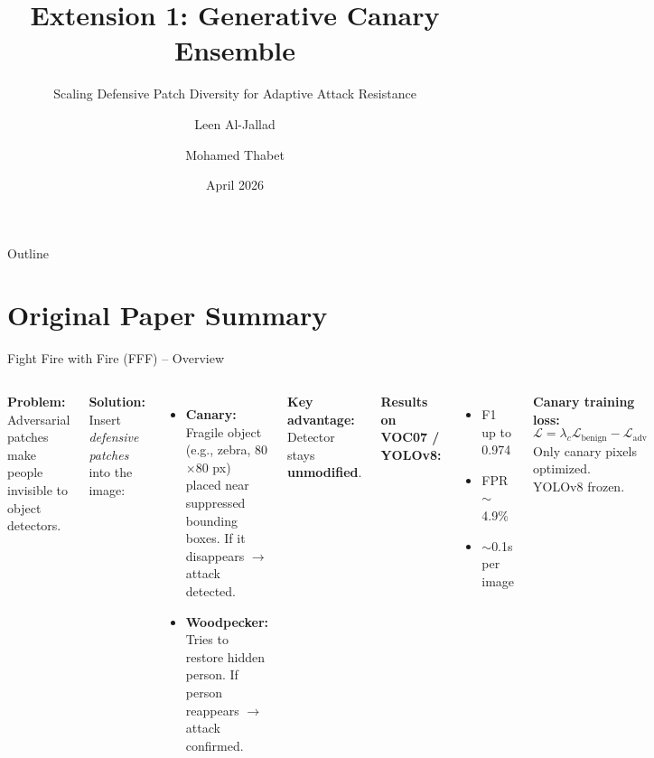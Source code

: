 \documentclass[aspectratio=169,11pt]{beamer}
\title[Extension 1: Generative Canary Ensemble]{Extension 1: Generative Canary Ensemble}
\subtitle{Scaling Defensive Patch Diversity for Adaptive Attack Resistance}
\author{Leen Al-Jallad \and Mohamed Thabet}
\institute{COSC 739 -- AI/ML Systems for Cybersecurity\\Khalifa University}
\date{April 2026}
\begin{document}
\begin{frame}
\titlepage
\end{frame}

\begin{frame}{Outline}
\tableofcontents
\end{frame}

\section{Original Paper Summary}

\begin{frame}{Fight Fire with Fire (FFF) -- Overview}
\begin{columns}
\textbf{Problem:} Adversarial patches make people invisible to object detectors.

\vspace{0.3cm}
\textbf{Solution:} Insert \textit{defensive patches} into the image:
\begin{itemize}
    \item \textbf{Canary:} Fragile object (e.g., zebra, 80$\times$80 px) placed near suppressed bounding boxes. If it disappears $\to$ attack detected.
    \item \textbf{Woodpecker:} Tries to restore hidden person. If person reappears $\to$ attack confirmed.
\end{itemize}

\vspace{0.3cm}
\textbf{Key advantage:} Detector stays \textbf{unmodified}.

\textbf{Results on VOC07 / YOLOv8:}
\begin{itemize}
    \item F1 up to 0.974
    \item FPR $\sim$4.9\%
    \item $\sim$0.1s per image
\end{itemize}

\vspace{0.3cm}
\textbf{Canary training loss:}
\begin{equation*}
    \mathcal{L} = \lambda_c \mathcal{L}_{\text{benign}} - \mathcal{L}_{\text{adv}}
\end{equation*}
Only canary pixels optimized.\\YOLOv8 frozen.
\end{columns}
\end{frame}
\end{document}
